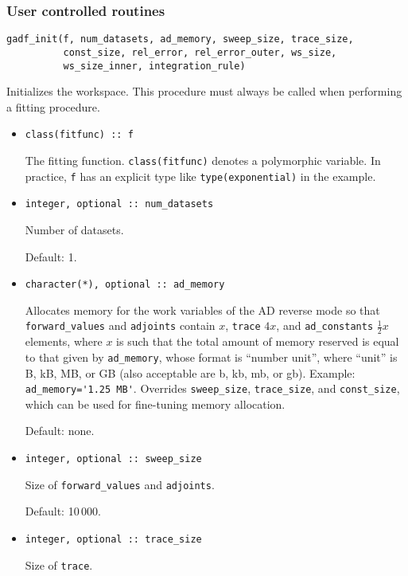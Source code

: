\documentclass{article}
\begin{document}
\subsubsection{\label{sec:user}User controlled routines}

\begin{verbatim}
gadf_init(f, num_datasets, ad_memory, sweep_size, trace_size,
          const_size, rel_error, rel_error_outer, ws_size, 
          ws_size_inner, integration_rule)
\end{verbatim}
Initializes the workspace. This procedure must always be called when
performing a fitting procedure.
\begin{itemize}
\item
\begin{verbatim}
class(fitfunc) :: f
\end{verbatim}
  The fitting function. \verb+class(fitfunc)+ denotes a polymorphic
  variable. In practice, \texttt{f} has an explicit type like
  \verb+type(exponential)+ in the example.
\item
\begin{verbatim}
integer, optional :: num_datasets
\end{verbatim}
  Number of datasets.

  Default: 1.
\item
\begin{verbatim}
character(*), optional :: ad_memory
\end{verbatim}
  Allocates memory for the work variables of the AD reverse mode so
  that \verb+forward_values+ and \verb+adjoints+ contain $x$,
  \verb+trace+ $4x$, and \verb+ad_constants+ $\frac{1}{2}x$ elements,
  where $x$ is such that the total amount of memory reserved is equal
  to that given by \verb+ad_memory+, whose format is ``number unit'',
  where ``unit'' is B, kB, MB, or GB (also acceptable are b, kb, mb,
  or gb). Example: \verb+ad_memory='1.25 MB'+. Overrides
  \verb+sweep_size+, \verb+trace_size+, and \verb+const_size+, which
  can be used for fine-tuning memory allocation.

  Default: none.
\item
\begin{verbatim}
integer, optional :: sweep_size
\end{verbatim}
  Size of \verb+forward_values+ and \verb+adjoints+.

  Default: 10\,000.
\item
\begin{verbatim}
integer, optional :: trace_size
\end{verbatim}
  Size of \verb+trace+.


\end{itemize}
\end{document}
